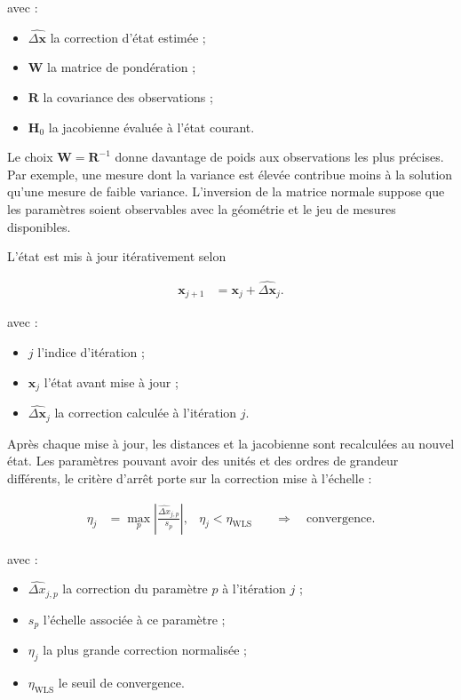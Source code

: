 avec :

\begin{itemize}
    \item $\widehat{\Delta\mathbf x}$ la correction d'état estimée ;
    \item $\mathbf W$ la matrice de pondération ;
    \item $\mathbf R$ la covariance des observations ;
    \item $\mathbf H_0$ la jacobienne évaluée à l'état courant.
\end{itemize}

Le choix $\mathbf W=\mathbf R^{-1}$ donne davantage de poids aux observations
les plus précises. Par exemple, une mesure dont la variance est élevée contribue
moins à la solution qu'une mesure de faible variance. L'inversion de la matrice
normale suppose que les paramètres soient observables avec la géométrie et le
jeu de mesures disponibles.

L'état est mis à jour itérativement selon

\begin{align}
\mathbf x_{j+1}
&=
\mathbf x_j+\widehat{\Delta\mathbf x}_j.
\label{eq:wls_iteration}
\end{align}

avec :

\begin{itemize}
    \item $j$ l'indice d'itération ;
    \item $\mathbf x_j$ l'état avant mise à jour ;
    \item $\widehat{\Delta\mathbf x}_j$ la correction calculée à l'itération
    $j$.
\end{itemize}

Après chaque mise à jour, les distances et la jacobienne sont recalculées au
nouvel état. Les paramètres pouvant avoir des unités et des ordres de grandeur
différents, le critère d'arrêt porte sur la correction mise à l'échelle :

\begin{align}
\eta_j
&=
\max_p\left|
\frac{\widehat{\Delta x}_{j,p}}{s_p}
\right|,
&
\eta_j<\eta_{\mathrm{WLS}}
&\quad\Longrightarrow\quad
\text{convergence}.
\label{eq:wls_stopping_criterion}
\end{align}

avec :

\begin{itemize}
    \item $\widehat{\Delta x}_{j,p}$ la correction du paramètre $p$ à
    l'itération $j$ ;
    \item $s_p$ l'échelle associée à ce paramètre ;
    \item $\eta_j$ la plus grande correction normalisée ;
    \item $\eta_{\mathrm{WLS}}$ le seuil de convergence.
\end{itemize}

